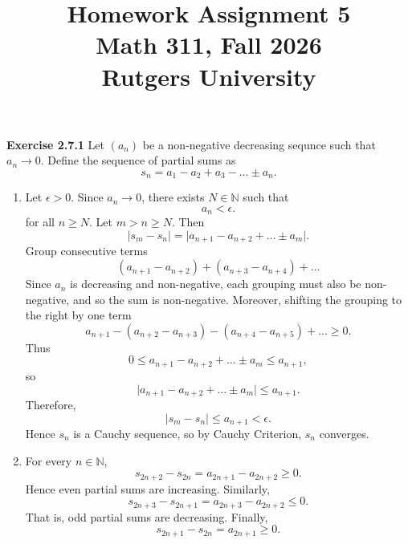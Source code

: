 \documentclass[12pt]{article}
\title{Homework Assignment 5 \\ \large Math 311, Fall 2026 \\ Rutgers University}
\author{}
\date{}
\begin{document}
\maketitle

\textbf{Exercise 2.7.1}
Let \( (a_{n}) \) be a non-negative decreasing sequnce such that \( a_n \to 0 \).
Define the sequence of partial sums as
\[
    s_n = a_1 - a_2 + a_3 - \dots \pm a_n.
\]
\begin{enumerate}[label=(\alph*)]
    \item
          Let \( \epsilon > 0 \).
          Since \( a_n \to 0 \), there exists \( N \in \mathbb{N} \) such that
          \[
              a_n < \epsilon.
          \]
          for all \( n \geq N \).
          Let \( m > n \geq N \). Then
          \[
              \vert s_m - s_n \vert = \vert a_{n+1} - a_{n+2} + \dots \pm a_m \vert.
          \]
          Group consecutive terms
          \[
              (a_{n+1} - a_{n+2}) + (a_{n+3} - a_{n+4}) + \dots
          \]
          Since \( a_n \) is decreasing and non-negative, each grouping must also be non-negative, and so the sum is non-negative.
          Moreover, shifting the grouping to the right by one term
          \[
              a_{n+1} - (a_{n+2} - a_{n+3}) - (a_{n+4} - a_{n+5}) + \dots \geq 0.
          \]
          Thus
          \[
              0 \leq  a_{n+1} - a_{n+2} + \dots \pm a_m \leq  a_{n+1},
          \]
          so
          \[
              \vert a_{n+1} - a_{n+2} + \dots \pm a_m \vert \leq a_{n+1}.
          \]
          Therefore,
          \[
              \vert s_m - s_n \vert \leq a_{n+1} < \epsilon.
          \]
          Hence \( s_n \) is a Cauchy sequence, so by Cauchy Criterion, \( s_n \) converges.

    \item For every \( n \in \mathbb{N} \),
          \[
              s_{2n+2} - s_{2n} = a_{2n+1} - a_{2n+2} \geq 0.
          \]
          Hence even partial sums are increasing.
          Similarly,
          \[
              s_{2n+3} - s_{2n+1} = a_{2n+3} - a_{2n+2} \leq 0.
          \]
          That is, odd partial sums are decreasing.
          Finally,
          \[
              s_{2n+1} - s_{2n} = a_{2n+1} \geq 0.
          \]


\end{enumerate}
\end{document}
